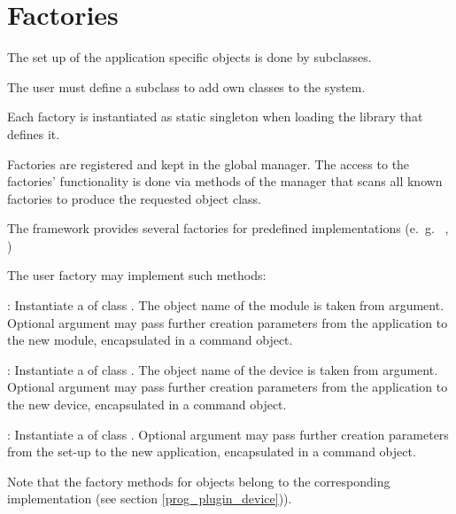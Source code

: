 \section{Factories}
The set up of the application specific objects is done 
   by  subclasses.
\begin{compactenum}

\item  The user must define a  subclass to add own classes to the system. 

\item  Each factory is instantiated as static singleton when 
      loading the library that defines it. 

\item  Factories are registered and kept in the global manager. 
      The access to the factories' functionality is done via methods of the
      manager that scans all known factories to produce the requested object
      class. 

\item  The framework provides several factories for predefined 
      implementations (e.~g.~ , )
            
      
\item The user factory may implement such methods:
\begin{compactdesc}
	\item [\func{Module* CreateModule(const char* classname, const char* modulename, Command* cmd)}] : 
	Instantiate a  of class . The object
	name of the module is taken from  argument. Optional 
	argument  may pass further creation parameters 
	from the application to the new module, encapsulated in a command object.
	
\item [\func{Device* CreateDevice(const char* classname, const char* devname, Command* cmd)}] : 
	Instantiate a  of class . The object
	name of the device is taken from  argument. Optional 
	argument  may pass further creation parameters 
	from the application to the new device, encapsulated in a command object.
	
\item [\func{Application* CreateApplication(const char* classname, Command* cmd)}] : 
	Instantiate a  of class .  Optional 
	argument  may pass further creation parameters 
	from the set-up to the new application, encapsulated in a command object.

            
\end{compactdesc}      

Note that the factory  methods for  objects
belong to the corresponding  implementation (see section \ref{prog_plugin_device})). 
      


\end{compactenum}

